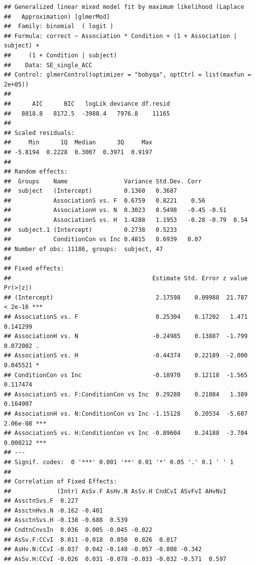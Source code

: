 \documentclass[
  man]{apa6}
\begin{document}
\begin{verbatim}
## Generalized linear mixed model fit by maximum likelihood (Laplace
##   Approximation) [glmerMod]
##  Family: binomial  ( logit )
## Formula: correct ~ Association * Condition + (1 + Association | subject) +  
##     (1 + Condition | subject)
##    Data: SE_single_ACC
## Control: glmerControl(optimizer = "bobyqa", optCtrl = list(maxfun = 2e+05))
## 
##      AIC      BIC   logLik deviance df.resid 
##   8018.8   8172.5  -3988.4   7976.8    11165 
## 
## Scaled residuals: 
##     Min      1Q  Median      3Q     Max 
## -5.8194  0.2228  0.3007  0.3971  0.9197 
## 
## Random effects:
##  Groups    Name                Variance Std.Dev. Corr             
##  subject   (Intercept)         0.1360   0.3687                    
##            AssociationS vs. F  0.6759   0.8221    0.56            
##            AssociationH vs. N  0.3023   0.5498   -0.45 -0.51      
##            AssociationS vs. H  1.4288   1.1953   -0.28 -0.79  0.54
##  subject.1 (Intercept)         0.2738   0.5233                    
##            ConditionCon vs Inc 0.4815   0.6939   0.07             
## Number of obs: 11186, groups:  subject, 47
## 
## Fixed effects:
##                                        Estimate Std. Error z value Pr(>|z|)    
## (Intercept)                             2.17598    0.09988  21.787  < 2e-16 ***
## AssociationS vs. F                      0.25304    0.17202   1.471 0.141299    
## AssociationH vs. N                     -0.24985    0.13887  -1.799 0.072002 .  
## AssociationS vs. H                     -0.44374    0.22189  -2.000 0.045521 *  
## ConditionCon vs Inc                    -0.18970    0.12118  -1.565 0.117474    
## AssociationS vs. F:ConditionCon vs Inc  0.29280    0.21084   1.389 0.164907    
## AssociationH vs. N:ConditionCon vs Inc -1.15128    0.20534  -5.607 2.06e-08 ***
## AssociationS vs. H:ConditionCon vs Inc -0.89604    0.24188  -3.704 0.000212 ***
## ---
## Signif. codes:  0 '***' 0.001 '**' 0.01 '*' 0.05 '.' 0.1 ' ' 1
## 
## Correlation of Fixed Effects:
##             (Intr) AsSv.F AsHv.N AsSv.H CndCvI ASvFvI AHvNvI
## AssctnSvs.F  0.227                                          
## AssctnHvs.N -0.162 -0.401                                   
## AssctnSvs.H -0.138 -0.688  0.539                            
## CndtnCnvsIn  0.036  0.005 -0.045 -0.022                     
## AsSv.F:CCvI  0.011 -0.018  0.050  0.026  0.017              
## AsHv.N:CCvI -0.037  0.042 -0.148 -0.057 -0.008 -0.342       
## AsSv.H:CCvI -0.026  0.031 -0.078 -0.033 -0.032 -0.571  0.597
\end{verbatim}
\end{document}
